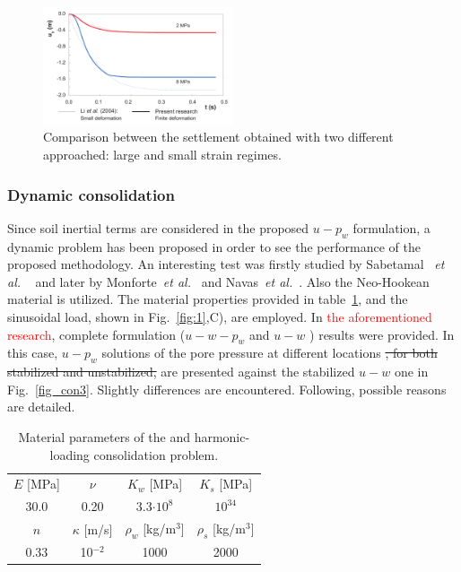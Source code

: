 \documentclass[twocolumn]{svjour3}          %
\newcommand{\etal}{
  \textit{et al.}
}
\begin{document}
\begin{figure}
  \includegraphics[width=0.5\textwidth]{Fig/borja2.pdf}
\caption{Comparison between the settlement obtained with two different approached: large and small strain regimes.}
\label{fig:6}      
\end{figure}

\subsubsection{Dynamic consolidation}
\label{sec:5:1:2}

Since soil inertial terms are considered in the proposed $u-p_w$ formulation, a dynamic problem has been proposed in order to see the performance of the proposed methodology. An interesting test was firstly studied by Sabetamal~\etal~\cite{Sabetamal:2015} and later by Monforte~\textit{et al.}~\cite{Monforte2019} and Navas~\textit{et al.}~\cite{Navas2016b,Navas2021}. Also the Neo-Hookean material is utilized. The material properties provided in table~\ref{tab:2}, and the sinusoidal load, shown in Fig.~\ref{fig:1},C), are employed. In \textcolor{red}{the aforementioned research}, complete formulation ($u-w-p_w$ and  $u-w$ ) results were provided. In this case, $u-p_w$ solutions of the pore pressure at different locations \sout{, for both stabilized and unstabilized,} are presented against the stabilized $u-w$ one in Fig.~\ref{fig_con3}. Slightly differences are encountered. Following, possible reasons are detailed.

\begin{table}[!t]
\centering
\caption{ Material parameters of the and harmonic-loading consolidation problem.} \label{tab:2}
	\vspace*{0.2cm}
	\begin{tabular}{cccc}
$E$ [MPa] & $\nu$ & $K_w$ [MPa] & $K_s$ [MPa] \\
		\noalign{\smallskip}\hline\noalign{\smallskip}
	 30.0& 0.20 & 3.3$\cdot 10^8$ & $10^{34}$ \\
	 \noalign{\smallskip}\hline\hline\noalign{\smallskip}
	  $n$ & $\kappa$ [m/s] & $\rho_w$ [kg/$\textrm{m}^3$] & $\rho_s$ [kg/$\textrm{m}^3$]\\
	  \noalign{\smallskip}\hline\noalign{\smallskip}
	  0.33  & 10$^{-2} $& 1000 & 2000
	\end{tabular}
\end{table}
\end{document}
